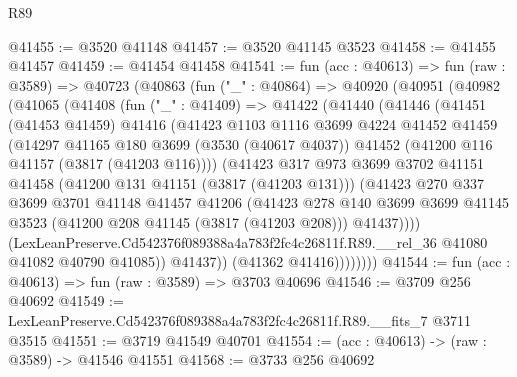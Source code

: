 \begin{lexlean}{R89}
\begin{coremodule}
@41455 := @3520 @41148
@41457 := @3520 @41145 @3523
@41458 := @41455 @41457
@41459 := @41454 @41458
@41541 := fun (acc : @40613) =>
  fun (raw : @3589) =>
  @40723
    (@40863
      (fun ("_" : @40864) =>
      @40920
        (@40951
          (@40982
            (@41065
              (@41408
                (fun ("_" : @41409) =>
                @41422
                  (@41440
                    (@41446
                      (@41451
                        (@41453 @41459)
                        @41416
                        (@41423
                          @1103
                          @1116
                          @3699
                          @4224
                          @41452
                          @41459
                          (@14297
                            @41165
                            @180
                            @3699
                            (@3530 (@40617 @4037))
                            @41452
                            (@41200 @116 @41157 (@3817 (@41203 @116))))
                          (@41423
                            @317
                            @973
                            @3699
                            @3702
                            @41151
                            @41458
                            (@41200 @131 @41151 (@3817 (@41203 @131)))
                            (@41423
                              @270
                              @337
                              @3699
                              @3701
                              @41148
                              @41457
                              @41206
                              (@41423
                                @278
                                @140
                                @3699
                                @3699
                                @41145
                                @3523
                                (@41200 @208 @41145 (@3817 (@41203 @208)))
                                @41437))))
                        (LexLeanPreserve.Cd542376f089388a4a783f2fc4c26811f.R89.__rel_36
                          @41080
                          @41082
                          @40790
                          @41085))
                      @41437))
                  (@41362 @41416))))))))
@41544 := fun (acc : @40613) => fun (raw : @3589) => @3703 @40696
@41546 := @3709 @256 @40692
@41549 := LexLeanPreserve.Cd542376f089388a4a783f2fc4c26811f.R89.__fits_7 @3711 @3515
@41551 := @3719 @41549 @40701
@41554 := (acc : @40613) -> (raw : @3589) -> @41546 @41551
@41568 := @3733
    @256
    @40692

\end{coremodule}
\end{lexlean}
